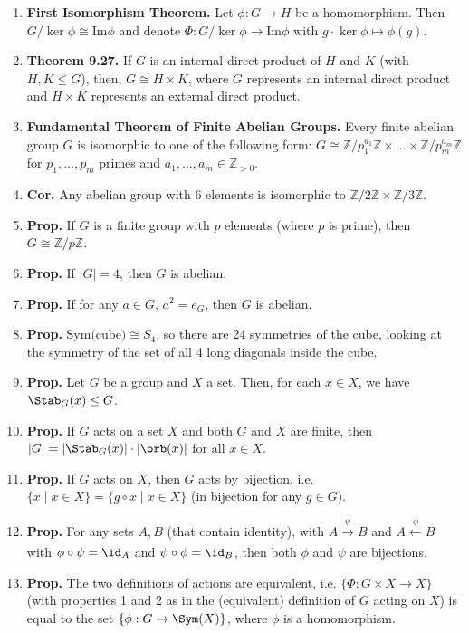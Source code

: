 \begin{enumerate}
	\item \textbf{First Isomorphism Theorem. } Let $\phi: G \to H$ be a homomorphism. Then $G/\ker\phi \cong \textrm{Im}\phi$ and denote $\Phi: G/\ker\phi \to \textrm{Im}\phi$ with $g \cdot \ker\phi \mapsto \phi(g)$. 
	\item \textbf{Theorem 9.27. } If $G$ is an internal direct product of $H$ and $K$ (with $H,K \leq G$), then, $G \cong H \times K$, where $G$ represents an internal direct product and $H \times K$ represents an external direct product. 
	\item \textbf{Fundamental Theorem of Finite Abelian Groups. } Every finite abelian group $G$ is isomorphic to one of the following form: $G \cong \mathbb{Z}/p_1^{a_1}\mathbb{Z} \times \dots \times \mathbb{Z}/p_m^{a_m}\mathbb{Z}$ for $p_1,\dots,p_m$ primes and $a_1,\dots,a_m \in \mathbb{Z}_{>0}$. 
	\item \textbf{Cor. } Any abelian group with 6 elements is isomorphic to $\mathbb{Z}/2\mathbb{Z} \times \mathbb{Z}/3\mathbb{Z}$. 
	\item \textbf{Prop. } If $G$ is a finite group with $p$ elements (where $p$ is prime), then $G \cong \mathbb{Z}/p\mathbb{Z}$. 
	\item \textbf{Prop. } If $|G| = 4$, then $G$ is abelian. 
	\item \textbf{Prop. } If for any $a \in G$, $a^2 = e_G$, then $G$ is abelian. 
	\item \textbf{Prop. } $\textrm{Sym(cube)} \cong S_4$, so there are 24 symmetries of the cube, looking at the symmetry of the set of all 4 long diagonals inside the cube. 
	\item \textbf{Prop. } Let $G$ be a group and $X$ a set. Then, for each $x \in X$, we have $\Stab_G(x) \leq G$. 
	\item \textbf{Prop. } If $G$ acts on a set $X$ and both $G$ and $X$ are finite, then $|G|=|\Stab_G(x)| \cdot |\orb(x)|$ for all $x \in X$. 
	\item \textbf{Prop. } If $G$ acts on $X$, then $G$ acts by bijection, i.e. $\{x \mid x \in X\} = \{g \circ x \mid x \in X\}$ (in bijection for any $g \in G$). 
	\item \textbf{Prop. } For any sets $A,B$ (that contain identity), with $A \xrightarrow[]{\psi} B$ and $A \xleftarrow[]{\phi} B$ with $\phi \circ \psi = \id_A$ and $\psi \circ \phi = \id_B$, then both $\phi$ and $\psi$ are bijections. 
	\item \textbf{Prop. } The two definitions of actions are equivalent, i.e. $\{\Phi: G \times X \to X\}$ (with properties 1 and 2 as in the (equivalent) definition of $G$ acting on $X$) is equal to the set $\{\phi: G \to \Sym(X)\}$, where $\phi$ is a homomorphism. 

\end{enumerate}
